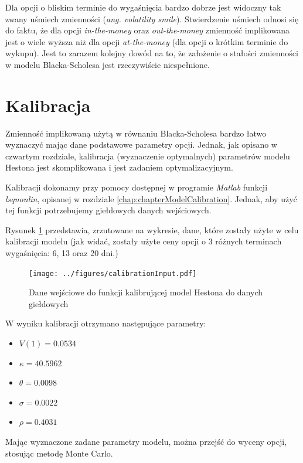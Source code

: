 \documentclass{pracamgr}
\begin{document}
Dla opcji o bliskim terminie do wygaśnięcia bardzo dobrze jest widoczny
tak zwany uśmiech zmienności (\textit{ang. volatility smile}). Stwierdzenie uśmiech 
odnosi się do faktu, że dla opcji \textit{in-the-money} oraz \textit{out-the-money}
zmienność implikowana jest o wiele wyższa niż dla opcji \textit{at-the-money} (dla opcji o krótkim
terminie do wykupu).
Jest to zarazem kolejny dowód na to, że założenie o stałości zmienności w modelu Blacka-Scholesa jest 
rzeczywiście niespełnione.


\section{Kalibracja}

Zmienność implikowaną użytą w równaniu Blacka-Scholesa 
bardzo łatwo wyznaczyć mając dane podstawowe parametry 
opcji. Jednak, jak opisano w czwartym rozdziale, 
kalibracja (wyznaczenie optymalnych) parametrów modelu Hestona jest skomplikowana i jest
zadaniem optymalizacyjnym.  

Kalibracji dokonamy przy pomocy dostępnej w programie \textit{Matlab} funkcji \textit{lsqnonlin}, 
opisanej w rozdziale \ref{chap:chapterModelCalibration}.
Jednak, aby użyć tej funkcji potrzebujemy giełdowych danych wejściowych.


Rysunek \ref{fig:calibration} przedstawia, zrzutowane na wykresie, dane, które
zostały użyte w celu kalibracji modelu (jak widać, zostały użyte ceny 
opcji o 3 różnych terminach wygaśnięcia: 
6, 13 oraz 20 dni.)

\begin{figure}
  \centering
  \texttt{[image: ../figures/calibrationInput.pdf]}
  \caption{Dane wejściowe do funkcji kalibrującej model Hestona do danych giełdowych}
  \label{fig:calibration}
\end{figure}

W wyniku kalibracji otrzymano następujące parametry:


\begin{itemize}
  \item $V(1) = 0.0534 $
  \item $\kappa = 40.5962$
  \item $\theta = 0.0098$
  \item $\sigma = 0.0022$
  \item $\rho = 0.4031$
\end{itemize}


Mając wyznaczone zadane parametry modelu, można przejść do wyceny opcji, stosując metodę Monte Carlo.
\end{document}

